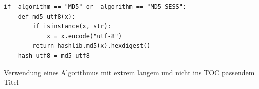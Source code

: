 \begin{code}[H]
    \begin{verbatim}
if _algorithm == "MD5" or _algorithm == "MD5-SESS":
    def md5_utf8(x):
        if isinstance(x, str):
            x = x.encode("utf-8")
        return hashlib.md5(x).hexdigest()
    hash_utf8 = md5_utf8
    \end{verbatim}
    \caption[Verwendung Algorithmus]{Verwendung eines Algorithmus mit extrem langem und nicht ins TOC passendem Titel}
    \label{code:md5}
\end{code}